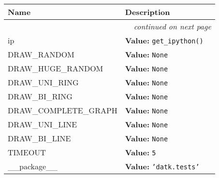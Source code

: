     \vspace{-1cm}
\hspace{\varindent}\begin{longtable}{|p{\varnamewidth}|p{\vardescrwidth}|l}
\cline{1-2}
\cline{1-2} \centering \textbf{Name} & \centering \textbf{Description}& \\
\cline{1-2}
\endhead\cline{1-2}\multicolumn{3}{r}{\small\textit{continued on next page}}\\\endfoot\cline{1-2}
\endlastfoot\raggedright i\-p\- & \raggedright \textbf{Value:} 
{\tt get\_ipython()}&\\
\cline{1-2}
\raggedright D\-R\-A\-W\-\_\-R\-A\-N\-D\-O\-M\- & \raggedright \textbf{Value:} 
{\tt None}&\\
\cline{1-2}
\raggedright D\-R\-A\-W\-\_\-H\-U\-G\-E\-\_\-R\-A\-N\-D\-O\-M\- & \raggedright \textbf{Value:} 
{\tt None}&\\
\cline{1-2}
\raggedright D\-R\-A\-W\-\_\-U\-N\-I\-\_\-R\-I\-N\-G\- & \raggedright \textbf{Value:} 
{\tt None}&\\
\cline{1-2}
\raggedright D\-R\-A\-W\-\_\-B\-I\-\_\-R\-I\-N\-G\- & \raggedright \textbf{Value:} 
{\tt None}&\\
\cline{1-2}
\raggedright D\-R\-A\-W\-\_\-C\-O\-M\-P\-L\-E\-T\-E\-\_\-G\-R\-A\-P\-H\- & \raggedright \textbf{Value:} 
{\tt None}&\\
\cline{1-2}
\raggedright D\-R\-A\-W\-\_\-U\-N\-I\-\_\-L\-I\-N\-E\- & \raggedright \textbf{Value:} 
{\tt None}&\\
\cline{1-2}
\raggedright D\-R\-A\-W\-\_\-B\-I\-\_\-L\-I\-N\-E\- & \raggedright \textbf{Value:} 
{\tt None}&\\
\cline{1-2}
\raggedright T\-I\-M\-E\-O\-U\-T\- & \raggedright \textbf{Value:} 
{\tt 5}&\\
\cline{1-2}
\raggedright \_\-\_\-p\-a\-c\-k\-a\-g\-e\-\_\-\_\- & \raggedright \textbf{Value:} 
{\tt \texttt{'}\texttt{datk.tests}\texttt{'}}&\\
\cline{1-2}
\end{longtable}

